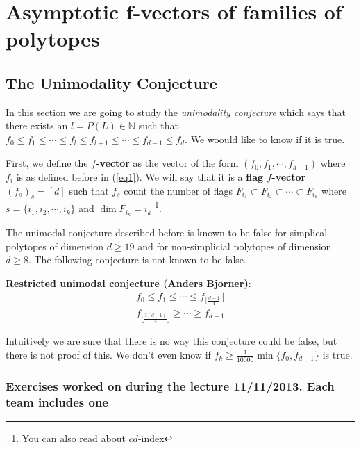 \chapter{Asymptotic f-vectors of families of polytopes}


\section{The Unimodality Conjecture}
In this section we are going to study the \textit{unimodality conjecture} which says that there exists an $l = P(L)\in\mathbb{N}$ such that $f_0\leq f_1 \leq \cdots\leq f_l \leq f_{l+1}\leq \cdots \leq f_{d-1}\leq f_d$. We woould like to know if it is true. 

First, we define the \textbf{$f$-vector} as the vector of the form $(f_0,f_{1},\cdots,f_{d-1})$ where $f_i$ is as defined before in (\ref{eq1}). We will say that it is a \textbf{flag $f$-vector} $(f_s)_s = [d]$ such that $f_s$ count the number of flags $F_{i_1} \subset F_{i_2} \subset \cdots \subset F_{i_k}$ where $s = \{i_1,i_2,\cdots, i_k \}$ and $\dim F_{i_k} = i_k$ \footnote{You can also read about $cd$-index}.

\bigskip
The unimodal conjecture described before is known to be false for simplical polytopes of dimension $d\geq 19$ and for non-simplicial polytopes of dimension $d \geq 8$. The following conjecture is not known to be false. 

\textbf{Restricted unimodal conjecture (Anders Bjorner)}: 
\begin{eqnarray*}
 f_0\leq f_1\leq \cdots \leq f_{\lfloor \frac{d-1}{4}}\rfloor\\
 f_{\lfloor \frac{3(d-1)}{4}\rfloor}\geq \cdots \geq f_{d-1}
\end{eqnarray*} 

Intuitively we are sure that there is no way this conjecture could be false, but there is not proof of this. We don't even know if $f_k\geq \frac{1}{10000}\min\{f_0,f_{d-1}\}$ is true.

\bigskip

\subsection{Exercises worked on during the lecture 11/11/2013. Each team includes one}

